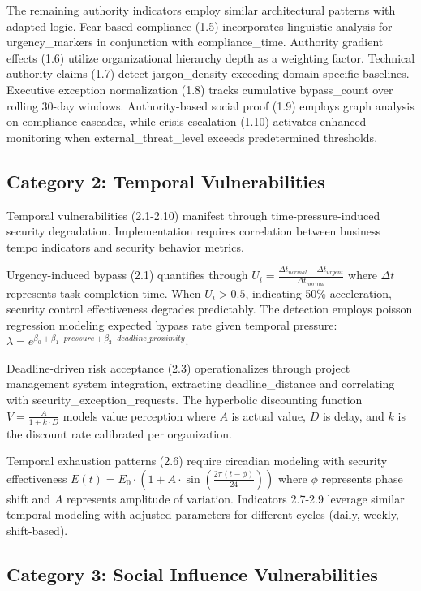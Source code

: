 \documentclass[10pt, twocolumn]{article}
\begin{document}
The remaining authority indicators employ similar architectural patterns with adapted logic. Fear-based compliance (1.5) incorporates linguistic analysis for urgency\_markers in conjunction with compliance\_time. Authority gradient effects (1.6) utilize organizational hierarchy depth as a weighting factor. Technical authority claims (1.7) detect jargon\_density exceeding domain-specific baselines. Executive exception normalization (1.8) tracks cumulative bypass\_count over rolling 30-day windows. Authority-based social proof (1.9) employs graph analysis on compliance cascades, while crisis escalation (1.10) activates enhanced monitoring when external\_threat\_level exceeds predetermined thresholds.

\subsection{Category 2: Temporal Vulnerabilities}

Temporal vulnerabilities (2.1-2.10) manifest through time-pressure-induced security degradation. Implementation requires correlation between business tempo indicators and security behavior metrics.

Urgency-induced bypass (2.1) quantifies through $U_i = \frac{\Delta t_{normal} - \Delta t_{urgent}}{\Delta t_{normal}}$ where $\Delta t$ represents task completion time. When $U_i > 0.5$, indicating 50\% acceleration, security control effectiveness degrades predictably. The detection employs poisson regression modeling expected bypass rate given temporal pressure: $\lambda = e^{\beta_0 + \beta_1 \cdot pressure + \beta_2 \cdot deadline\_proximity}$.

Deadline-driven risk acceptance (2.3) operationalizes through project management system integration, extracting deadline\_distance and correlating with security\_exception\_requests. The hyperbolic discounting function $V = \frac{A}{1 + k \cdot D}$ models value perception where $A$ is actual value, $D$ is delay, and $k$ is the discount rate calibrated per organization.

Temporal exhaustion patterns (2.6) require circadian modeling with security effectiveness $E(t) = E_0 \cdot (1 + A \cdot \sin(\frac{2\pi(t - \phi)}{24}))$ where $\phi$ represents phase shift and $A$ represents amplitude of variation. Indicators 2.7-2.9 leverage similar temporal modeling with adjusted parameters for different cycles (daily, weekly, shift-based).

\subsection{Category 3: Social Influence Vulnerabilities}
\end{document}
